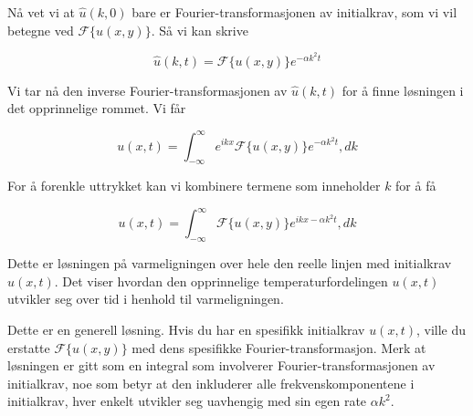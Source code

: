 Nå vet vi at $\hat{u}(k,0)$ bare er Fourier-transformasjonen av initialkrav, som vi vil betegne ved $\mathscr{F}\{ u(x,y) \}$. Så vi kan skrive

\begin{equation*}
\hat{u}(k,t) = \mathscr{F}\{ u(x,y) \} e^{-\alpha k^2 t}
\end{equation*}

Vi tar nå den inverse Fourier-transformasjonen av $\hat{u}(k,t)$ for å finne løsningen i det opprinnelige rommet. Vi får

\begin{equation*}
u(x,t) =  \int_{-\infty}^{\infty} e^{ikx} \mathscr{F}\{ u(x,y) \} e^{-\alpha k^2 t} , dk
\end{equation*}

For å forenkle uttrykket kan vi kombinere termene som inneholder $k$ for å få

\begin{equation*}
u(x,t) =  \int_{-\infty}^{\infty} \mathscr{F}\{ u(x,y) \} e^{ikx -\alpha k^2 t} , dk
\end{equation*}

Dette er løsningen på varmeligningen over hele den reelle linjen med initialkrav $u(x,t)$. Det viser hvordan den opprinnelige temperaturfordelingen $u(x,t)$ utvikler seg over tid i henhold til varmeligningen.

Dette er en generell løsning. Hvis du har en spesifikk initialkrav $u(x,t)$, ville du erstatte $\mathscr{F}\{ u(x,y) \}$ med dens spesifikke Fourier-transformasjon. Merk at løsningen er gitt som en integral som involverer Fourier-transformasjonen av initialkrav, noe som betyr at den inkluderer alle frekvenskomponentene i initialkrav, hver enkelt utvikler seg uavhengig med sin egen rate $\alpha k^2$.